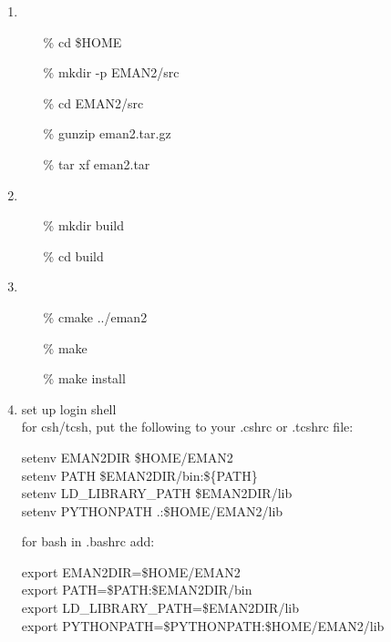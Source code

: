 \begin{enumerate}
    \item
      \color{blue}
      \begin{itemize}
          \item[\%] cd \$HOME
          \item[\%] mkdir -p EMAN2/src
          \item[\%] cd EMAN2/src
          \item[\%] gunzip eman2.tar.gz
          \item[\%] tar xf eman2.tar \\
      \end{itemize}
      \normalcolor
    \item
      \color{blue}
      \begin{itemize}
	  \item[\%]mkdir build
	  \item[\%]cd build \\
       \end{itemize}
      \normalcolor

     \item       
       \color{blue}
       \begin{itemize}
	 \item[\%]cmake ../eman2
         \item[\%]make
         \item[\%]make install \\
       \end{itemize}
       \normalcolor

     \item
          set up login shell\\
          for csh/tcsh, put the following to your .cshrc or .tcshrc file:
	  
          \color{blue}
          setenv EMAN2DIR \$HOME/EMAN2\\
          setenv PATH \$EMAN2DIR/bin:\$\{PATH\}\\
          setenv LD\_LIBRARY\_PATH  \$EMAN2DIR/lib\\
          setenv PYTHONPATH .:\$HOME/EMAN2/lib\\
	  \normalcolor

	  for bash in .bashrc add:
	
	  \color{blue}
          export EMAN2DIR=\$HOME/EMAN2\\
          export PATH=\$PATH:\$EMAN2DIR/bin\\
          export LD\_LIBRARY\_PATH=\$EMAN2DIR/lib\\
          export PYTHONPATH=\$PYTHONPATH:\$HOME/EMAN2/lib
	  \normalcolor
\end{enumerate}


